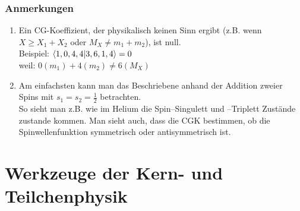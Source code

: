 \documentclass[Ex4_Zusammenfassung.tex]{subfiles}
\begin{document}
\subsection*{Anmerkungen}
\begin{enumerate}
	\item Ein CG-Koeffizient, der physikalisch keinen Sinn ergibt (z.B. wenn $X \ge X_1 + X_2$ oder $M_X \neq m_1 + m_2$), ist null.\\
	Beispiel: $\braket{1,0,4,4|3,6,1,4}=0$\\
	weil: $0 (m_1) + 4(m_2) \neq 6 (M_X)$
	\item Am einfachsten kann man das Beschriebene anhand der Addition zweier Spins mit $s_1=s_2=\frac{1}{2}$ betrachten.\\
	So sieht man z.B. wie im Helium die Spin--Singulett und --Triplett Zustände zustande kommen. Man sieht auch, dass die CGK bestimmen, ob die Spinwellenfunktion symmetrisch oder antisymmetrisch ist.
\end{enumerate}

\chapter{Werkzeuge der Kern- und Teilchenphysik} 
\end{document}
